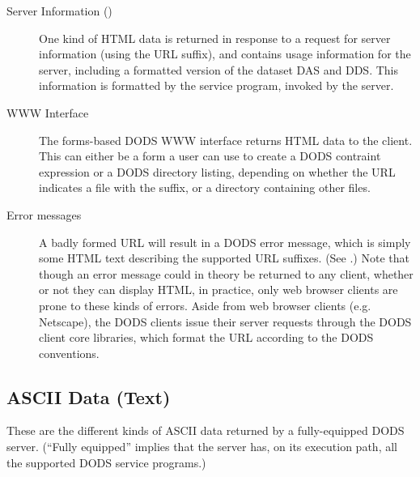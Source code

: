 \begin{description}
\item[Server Information ()] 
  
  One kind of HTML data is returned in response to a request for
  server information (using the  URL suffix), and contains
  usage information for the server, including a formatted version of
  the dataset DAS and DDS.  This information is formatted by the
   service program, invoked by the server.

\item[WWW Interface] 
  
  The forms-based DODS WWW interface returns HTML data to the client.
  This can either be a form a user can use to create a DODS contraint
  expression or a DODS directory listing, depending on whether the URL
  indicates a file with the  suffix, or a directory
  containing other files.

\item[Error messages] 

  A badly formed URL will result in a DODS error message, which is
  simply some HTML text describing the supported URL suffixes.  (See
  .)  Note that though an error message could
  in theory be returned to any client, whether or not they can display
  HTML, in practice, only web browser clients are prone to these kinds
  of errors.  Aside from web browser clients (e.g. Netscape), the DODS
  clients issue their server requests through the DODS client core
  libraries, which format the URL according to the DODS conventions.  

\end{description}



\subsection{ASCII Data (Text)}

These are the different kinds of ASCII data returned by a
fully-equipped DODS server.  (``Fully equipped'' implies that the
server has, on its execution path, all the supported DODS service
programs.)

